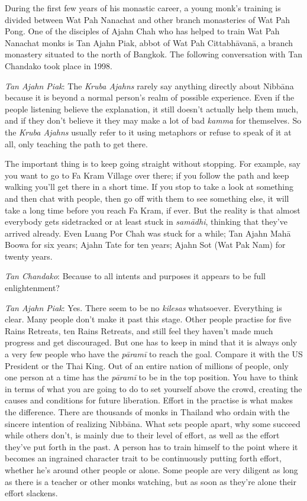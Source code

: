 
During the first few years of his monastic career, a young monk's
training is divided between Wat Pah Nanachat and other branch
monasteries of Wat Pah Pong. One of the disciples of Ajahn Chah who has
helped to train Wat Pah Nanachat monks is Tan Ajahn Piak, abbot of Wat
Pah Cittabhāvanā, a branch monastery situated to the north of Bangkok. 
The following conversation with Tan Chandako took place in 1998. 

\emph{Tan Ajahn Piak}: The \emph{Kruba Ajahns} rarely say anything
directly about Nibbāna because it is beyond a normal person's realm of
possible experience. Even if the people listening believe the
explanation, it still doesn't actually help them much, and if they don't
believe it they may make a lot of bad \emph{kamma} for themselves. So
the \emph{Kruba Ajahns} usually refer to it using metaphors or refuse
to speak of it at all, only teaching the path to get there. 

The important thing is to keep going straight without stopping. For
example, say you want to go to Fa Kram Village over there; if you follow
the path and keep walking you'll get there in a short time. If you stop
to take a look at something and then chat with people, then go off with
them to see something else, it will take a long time before you reach Fa
Kram, if ever. But the reality is that almost everybody gets sidetracked
or at least stuck in \emph{samādhi}, thinking that they've arrived
already. Even Luang Por Chah was stuck for a while; Tan Ajahn Mahā Boowa
for six years; Ajahn Tate for ten years; Ajahn Sot (Wat Pak Nam) for
twenty years. 

\emph{Tan Chandako}: Because to all intents and purposes it appears to
be full enlightenment? 

\emph{Tan Ajahn Piak}: Yes. There seem to be no \emph{kilesas}
whatsoever. Everything is clear. Many people don't make it past this
stage. Other people practise for five Rains Retreats, ten Rains
Retreats, and still feel they haven't made much progress and get
discouraged. But one has to keep in mind that it is always only a very
few people who have the \emph{pāramī} to reach the goal. Compare it with
the US President or the Thai King. Out of an entire nation of millions
of people, only one person at a time has the \emph{pāramī} to be in the
top position. You have to think in terms of what you are going to do to
set yourself above the crowd, creating the causes and conditions for
future liberation. Effort in the practise is what makes the difference. 
There are thousands of monks in Thailand who ordain with the sincere
intention of realizing Nibbāna. What sets people apart, why some succeed
while others don't, is mainly due to their level of effort, as well as
the effort they've put forth in the past. A person has to train himself
to the point where it becomes an ingrained character trait to be
continuously putting forth effort, whether he's around other people or
alone. Some people are very diligent as long as there is a teacher or
other monks watching, but as soon as they're alone their effort
slackens. 

